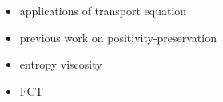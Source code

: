 \begin{itemize}
\item applications of transport equation
\item previous work on positivity-preservation
\item entropy viscosity
\item FCT
\end{itemize}
